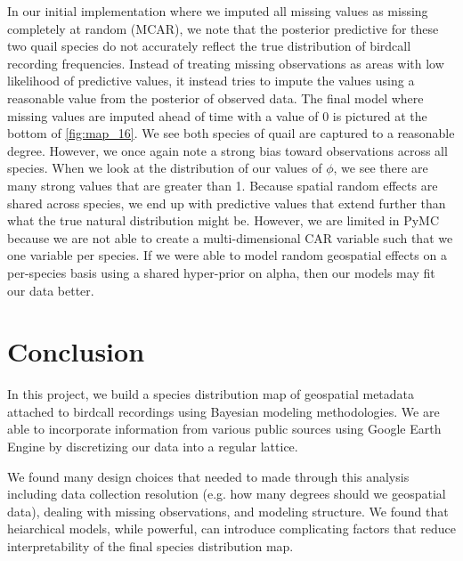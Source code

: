 \documentclass[notitlepage]{article}
\begin{document}
In our initial implementation where we imputed all missing values as missing completely at random (MCAR), we note that the posterior predictive for these two quail species do not accurately reflect the true distribution of birdcall recording frequencies.
Instead of treating missing observations as areas with low likelihood of predictive values, it instead tries to impute the values using a reasonable value from the posterior of observed data.
The final model where missing values are imputed ahead of time with a value of 0 is pictured at the bottom of \ref{fig:map_16}.
We see both species of quail are captured to a reasonable degree.
However, we once again note a strong bias toward observations across all species.
When we look at the distribution of our values of $\phi$, we see there are many strong values that are greater than 1.
Because spatial random effects are shared across species, we end up with predictive values that extend further than what the true natural distribution might be.
However, we are limited in PyMC because we are not able to create a multi-dimensional CAR variable such that we one variable per species.
If we were able to model random geospatial effects on a per-species basis using a shared hyper-prior on alpha, then our models may fit our data better.


\section{Conclusion}

In this project, we build a species distribution map of geospatial metadata attached to birdcall recordings using Bayesian modeling methodologies.
We are able to incorporate information from various public sources using Google Earth Engine by discretizing our data into a regular lattice.

We found many design choices that needed to made through this analysis including data collection resolution (e.g. how many degrees should we geospatial data), dealing with missing observations, and modeling structure.
We found that heiarchical models, while powerful, can introduce complicating factors that reduce interpretability of the final species distribution map.



\printbibliography
\end{document}
